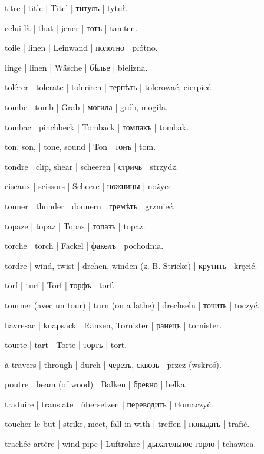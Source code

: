 \begin{outdent}{1em}
titre | title | Titel | титулъ | tytuł.

celui-là | that | jener | тотъ | tamten.

toile | linen | Leinwand | полотно | płótno.

\uvsubentry{}
linge | linen | Wäsche | бѣлье | bielizna.

tolérer | tolerate | toleriren | терпѣть | tolerować,
cierpieć.

tombe | tomb | Grab | могила | grób, mogiła.

tombac | pinchbeck | Tomback | томпакъ | tombak.

ton, son, | tone, sound | Ton | тонъ | tom.

tondre | clip, shear | scheeren | стричь | strzydz.

\uvsubentry{}
ciseaux | scissors | Scheere | ножницы | nożyce.

tonner | thunder | donnern | гремѣть | grzmieć.

topaze | topaz | Topas | топазъ | topaz.

torche | torch | Fackel | факелъ | pochodnia.

tordre | wind, twist | drehen, winden (z. B. Stricke) | крутить | kręcić.

torf | turf | Torf | торфъ | torf.

tourner (avec un tour) | turn (on a lathe) | drechseln | точить | toczyć.

havresac | knapsack | Ranzen, Tornister | ранецъ | tornister.

tourte | tart | Torte | тортъ | tort.

à travers | through | durch | черезъ, сквозь | przez (wskroś).

poutre | beam (of wood) | Balken | бревно | belka.

traduire | translate | übersetzen | переводить | tłomaczyć.

toucher le but | strike, meet, fall in with | treffen | попадать | trafić.

trachée-artère | wind-pipe | Luftröhre | дыхательное горло | tchawica.


\end{outdent}

